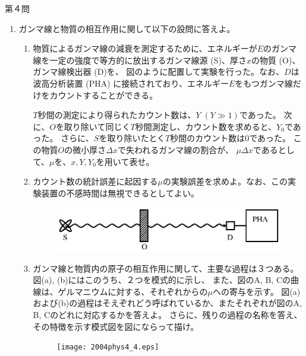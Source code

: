 \documentclass[fleqn]{jbook}
\begin{document}
\begin{question}{第４問}{}
\begin{enumerate}
\item
ガンマ線と物質の相互作用に関して以下の設問に答えよ。

\begin{enumerate}
\item 物質によるガンマ線の減衰を測定するために、エネルギーが$E$のガンマ線を一定の強度で等方的に放出するガンマ線源 (S)、厚さ$x$の物質 (O)、ガンマ線検出器 (D)を、
図のように配置して実験を行った。なお、$D$は波高分析装置 (PHA) に接続されており、エネルギー$E$をもつガンマ線だけをカウントすることができる。

$T$秒間の測定により得られたカウント数は、$Y\; (Y\gg 1)$であった。
次に、$O$を取り除いて同じく$T$秒間測定し、カウント数を求めると、$Y_0$であった。
さらに、$S$を取り除いたとく$T$秒間のカウント数は0であった。
この物質$O$の微小厚さ$\Delta x$で失われるガンマ線の割合が、
$\mu\Delta x$であるとして、$\mu$を、$x,Y,Y_0$を用いて表せ。

\item カウント数の統計誤差に起因する$\mu$の実験誤差を求めよ。なお、この実験装置の不感時間は無視できるとしてよい。
\begin{figure}[htbp]
\begin{center}
\includegraphics[width=10cm]{2004phys4_3.eps}
\caption{}
\end{center}
\end{figure}

\item ガンマ線と物質内の原子の相互作用に関して、主要な過程は３つある。
図(a), (b)にはこのうち、２つを模式的に示し、
また、図のA, B, Cの曲線は、ゲルマニウムに対する、それぞれからの$\mu$への寄与を示す。
図(a)および(b)の過程はそえぞれどう呼ばれているか、またそれぞれが図のA, B, Cのどれに対応するかを答えよ。
さらに、残りの過程の名称を答え、その特徴を示す模式図を図にならって描け。

\begin{figure}[htbp]
\begin{center}
\texttt{[image: 2004phys4\_4.eps]}
\caption{}
\end{center}
\end{figure}


\end{enumerate}
\end{enumerate}
\end{question}
\end{document}
